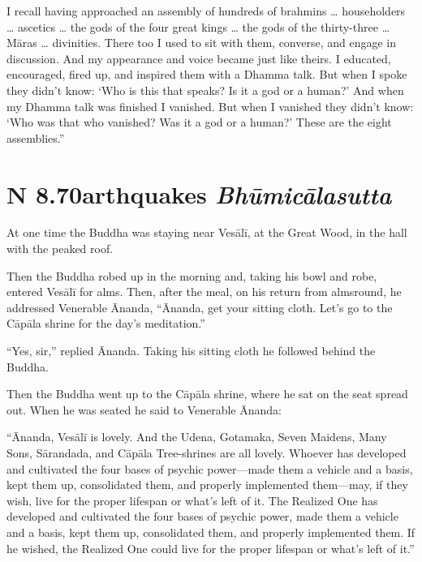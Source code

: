 \documentclass[12pt,openany]{book}%
\newcommand*{\suttatitleacronym}[1]{\smaller[2]{#1}\vspace*{.3em}}
\newcommand*{\suttatitletranslation}[1]{\linebreak{#1}}
\newcommand*{\suttatitleroot}[1]{\linebreak\smaller[2]\itshape{#1}}
\newcommand*{\tocacronym}[1]{\hspace*{-3.3em}{#1}\quad}
\newcommand*{\toctranslation}[1]{#1}
\newcommand*{\tocroot}[1]{(\textit{#1})}
\begin{document}
I recall having approached an assembly of hundreds of brahmins … householders … ascetics … the gods of the four great kings … the gods of the thirty-three … \textsanskrit{Māras} … divinities. There too I used to sit with them, converse, and engage in discussion. And my appearance and voice became just like theirs. I educated, encouraged, fired up, and inspired them with a Dhamma talk. But when I spoke they didn’t know: ‘Who is this that speaks? Is it a god or a human?’ And when my Dhamma talk was finished I vanished. But when I vanished they didn’t know: ‘Who was that who vanished? Was it a god or a human?’ These are the eight assemblies.” 

%
\section*{{\suttatitleacronym AN 8.70}{\suttatitletranslation Earthquakes }{\suttatitleroot Bhūmicālasutta}}
\addcontentsline{toc}{section}{\tocacronym{AN 8.70} \toctranslation{Earthquakes } \tocroot{Bhūmicālasutta}}

At one time the Buddha was staying near \textsanskrit{Vesālī}, at the Great Wood, in the hall with the peaked roof. 

Then the Buddha robed up in the morning and, taking his bowl and robe, entered \textsanskrit{Vesālī} for alms. Then, after the meal, on his return from almsround, he addressed Venerable Ānanda, “Ānanda, get your sitting cloth. Let’s go to the \textsanskrit{Cāpāla} shrine for the day’s meditation.” 

“Yes, sir,” replied Ānanda. Taking his sitting cloth he followed behind the Buddha. 

Then the Buddha went up to the \textsanskrit{Cāpāla} shrine, where he sat on the seat spread out. When he was seated he said to Venerable Ānanda: 

“Ānanda, \textsanskrit{Vesālī} is lovely. And the Udena, Gotamaka, Seven Maidens, Many Sons, \textsanskrit{Sārandada}, and \textsanskrit{Cāpāla} Tree-shrines are all lovely. Whoever has developed and cultivated the four bases of psychic power—made them a vehicle and a basis, kept them up, consolidated them, and properly implemented them—may, if they wish, live for the proper lifespan or what’s left of it. The Realized One has developed and cultivated the four bases of psychic power, made them a vehicle and a basis, kept them up, consolidated them, and properly implemented them. If he wished, the Realized One could live for the proper lifespan or what’s left of it.” 
\end{document}
